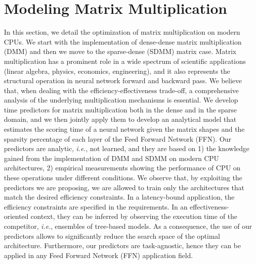 










\section{Modeling Matrix Multiplication}
\label{sec:ModelMatMult}
In this section, we detail the optimization of matrix multiplication on modern CPUs. We start with the implementation of dense-dense matrix multiplication (DMM) and then we move to the sparse-dense (SDMM) matrix case. Matrix multiplication has a prominent role in a wide spectrum of scientific applications (linear algebra, physics, economics, engineering), and it also represents the structural operation in neural network forward and backward pass. We believe that, when dealing with the efficiency-effectiveness trade-off, a comprehensive analysis of the underlying multiplication mechanisms is essential. We develop time predictors for matrix multiplication both in the dense and in the sparse domain, and we then jointly apply them to develop an analytical model that estimates the scoring time of a neural network given the matrix shapes and the sparsity percentage of each layer of the Feed Forward Network (FFN). Our predictors are analytic, \textit{i.e.}, not learned, and they are based on 1) the knowledge gained from the implementation of DMM and SDMM on modern CPU architectures, 2) empirical measurements showing the performance of CPU on these operations under different conditions. 
 We observe that, by exploiting the predictors we are proposing, we are allowed to train only the architectures that match the desired efficiency constraints. In a latency-bound application, the efficiency constraints are specified in the requirements. In an effectiveness-oriented context, they can be inferred by observing the execution time of the competitor, \textit{i.e.}, ensembles of tree-based models. As a consequence, the use of our predictors allows to significantly reduce the search space of the optimal architecture. Furthermore, our predictors are task-agnostic, hence they can be applied in any Feed Forward Network (FFN) application field.

